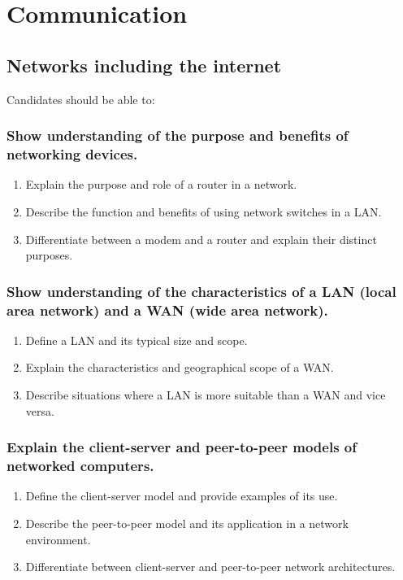 \documentclass[a4paper]{article}
\begin{document}
\section{Communication}
\subsection{Networks including the internet}
Candidates should be able to:
\subsubsection{Show understanding of the purpose and benefits of networking devices.}
\begin{enumerate}
  \item Explain the purpose and role of a router in a network.
  \item Describe the function and benefits of using network switches in a LAN.
  \item Differentiate between a modem and a router and explain their distinct purposes.
\end{enumerate}

\subsubsection{Show understanding of the characteristics of a LAN (local area network) and a WAN (wide area network).}
\begin{enumerate}
  \item Define a LAN and its typical size and scope.
  \item Explain the characteristics and geographical scope of a WAN.
  \item Describe situations where a LAN is more suitable than a WAN and vice versa.
\end{enumerate}

\subsubsection{Explain the client-server and peer-to-peer models of networked computers.}
\begin{enumerate}
  \item Define the client-server model and provide examples of its use.
  \item Describe the peer-to-peer model and its application in a network environment.
  \item Differentiate between client-server and peer-to-peer network architectures.
\end{enumerate}
\end{document}
